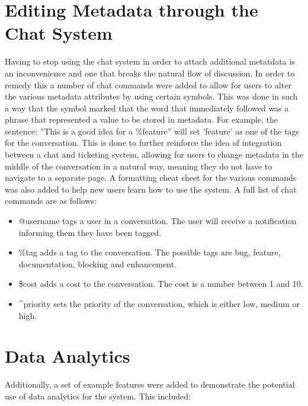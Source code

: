 \documentclass{l4proj}
\begin{document}
\section{Editing Metadata through the Chat System}

Having to stop using the chat system in order to attach additional metatdata is an inconvenience and one that breaks the natural flow of discussion.  In order to remedy this a number of chat commands were added to allow for users to alter the various metadata attributes by using certain symbols. This was done in such a way that the symbol marked that the word that immediately followed was a phrase that represented a value to be stored in metadata. For example, the sentence:
\newline
\newline
''This is a good idea for a \%feature''
\newline
\newline
will set 'feature' as one of the tags for the conversation.  This is done to further reinforce the idea of integration between a chat and ticketing system, allowing for users to change metadata in the middle of the conversation in a natural way, meaning they do not have to navigate to a separate page.  A formatting cheat sheet for the various commands was also added to help new users learn how to use the system.  A full list of chat commands are as follows:

\begin{itemize}
\item @username tags a user in a conversation.  The user will receive a notification informing them they have been tagged.
\item \%tag adds a tag to the conversation.  The possible tags are bug, feature, documentation, blocking and enhancement.
\item \$cost adds a cost to the conversation.  The cost is a number between 1 and 10.
\item \textasciicircum priority sets the priority of the conversation, which is either low, medium or high.
\end{itemize}

\newpage

\section{Data Analytics}
Additionally, a set of example features were added to demonstrate the potential use of data analytics for the system.  This included:
\end{document}
